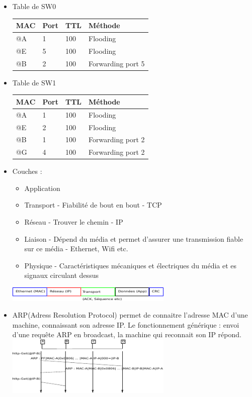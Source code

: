 \begin{itemize}
	\item Table de SW0
	\begin{tabular}{|l|l|l|l|} \hline
		MAC & Port & TTL & Méthode\\ \hline
		@A & 1 & 100 & Flooding \\ \hline
		@E & 5 & 100 & Flooding \\ \hline
		@B & 2 & 100 & Forwarding port 5\\ \hline
	\end{tabular}

	\item Table de SW1
	\begin{tabular}{|l|l|l|l|} \hline
		MAC & Port & TTL & Méthode\\ \hline
		@A & 1 & 100 & Flooding \\ \hline
		@E & 2 & 100 & Flooding \\ \hline
		@B & 1 & 100 & Forwarding port 2 \\ \hline
		@G & 4 & 100 & Forwarding port 2 \\ \hline
	\end{tabular}
\end{itemize}

	\begin{itemize}
		\item Couches : 
			\begin{itemize}
				\item Application
				\item Transport - Fiabilité de bout en bout - TCP
				\item Réseau - Trouver le chemin - IP
				\item Liaison - Dépend du média et permet d'assurer une transmission fiable sur ce média - Ethernet, Wifi etc.
				\item Physique - Caractéristiques mécaniques et électriques du média et es signaux circulant dessus
			\end{itemize}
		\includegraphics[width=300px]{Images/09_OSI.pdf}
		\item ARP(Adress Resolution Protocol) permet de connaitre l'adresse MAC d'une machine, connaissant son adresse IP. Le fonctionnement générique : envoi d'une requête ARP en broadcast, la machine qui reconnait son IP répond.\\
\includegraphics[width=300px]{Images/10_ARP.pdf}\\

	\end{itemize}

